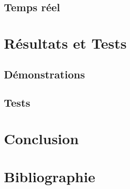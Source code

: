 \documentclass[12pt]{article}
\begin{document}
\subsection{Temps réel}

\newpage

\section{Résultats et Tests}

\subsection{Démonstrations}

\subsection{Tests}



\newpage
\section{Conclusion}


\newpage
\section{Bibliographie}


		
\end{document}
